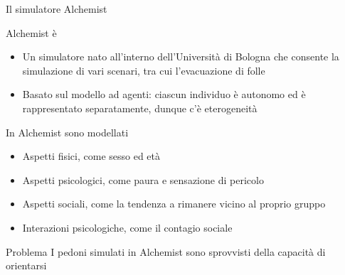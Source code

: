 \documentclass{beamer}
\begin{document}
\begin{frame}{Il simulatore Alchemist}
\begin{block}{Alchemist è}
\begin{itemize}
    \item Un simulatore nato all'interno dell'Università di Bologna che consente la simulazione di vari scenari, tra cui l'\textcolor{bostonuniversityred}{evacuazione di folle}
    \item Basato sul modello ad agenti: ciascun individuo è autonomo ed è rappresentato separatamente, dunque c'è eterogeneità
\end{itemize}
\end{block}
\begin{block}{In Alchemist sono modellati}
\begin{itemize}
    \item Aspetti fisici, come sesso ed età
    \item Aspetti psicologici, come paura e sensazione di pericolo
    \item Aspetti sociali, come la tendenza a rimanere vicino al proprio gruppo
    \item Interazioni psicologiche, come il contagio sociale
\end{itemize}
\end{block}
\begin{alertblock}{Problema}
I pedoni simulati in Alchemist sono sprovvisti della capacità di orientarsi
\end{alertblock}
\end{frame}
\end{document}
